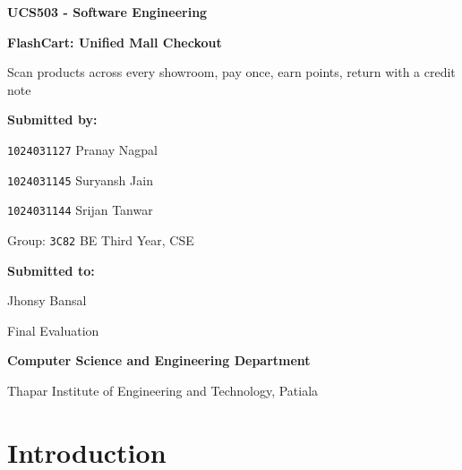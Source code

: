 \documentclass[12pt,letterpaper,twoside,openany]{report}
\newcommand{\coursetitle}{UCS503 - Software Engineering}
\begin{document}
\begin{titlepage}
  \centering
  \vspace*{0.6in}
  {\large\bfseries \coursetitle\par}
  \vspace{0.7in}
  {\LARGE\bfseries FlashCart: Unified Mall Checkout\par}
  \vspace{6pt}
  Scan products across every showroom, pay once, earn points, return with a credit note\par
  \vspace{1.1in}
  {\large\bfseries Submitted by:\par}
  \vspace{8pt}
  {\large
    \texttt{1024031127} Pranay Nagpal\par
    \texttt{1024031145} Suryansh Jain\par
    \texttt{1024031144} Srijan Tanwar\par}
  \vspace{10pt}
  Group: \texttt{3C82} BE Third Year, CSE\par
  \vspace{1.1in}
  {\large\bfseries Submitted to:\par}
  \vspace{6pt}
  Jhonsy Bansal\par
  \vfill
  {\large Final Evaluation\par}
  \vspace{4pt}
  {\large\bfseries Computer Science and Engineering Department\par}
  \vspace{4pt}
  Thapar Institute of Engineering and Technology, Patiala\par
\end{titlepage}

\tableofcontents

\chapter{Introduction}
\end{document}
